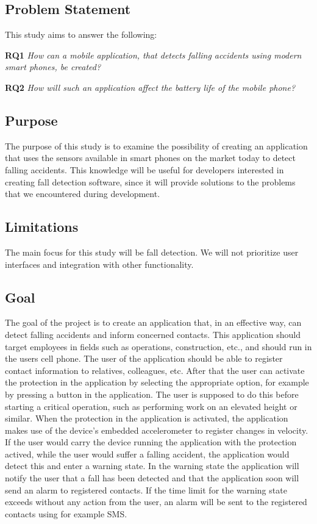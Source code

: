 \documentclass[12pt, a4paper, onecolumn]{article}
\begin{document}
		\subsection{Problem Statement}
		
		This study aims to answer the following:
		
		\textbf{RQ1} \textit{How can a mobile application, that detects falling accidents using modern smart phones, be created?}
		
		\textbf{RQ2} \textit{How will such an application affect the battery life of the mobile phone?}
		
		
		\subsection{Purpose}
		
		The purpose of this study is to examine the possibility of creating an application that uses the sensors available in smart phones on the market today to detect falling accidents. This knowledge will be useful for developers interested in creating fall detection software, since it will provide solutions to the problems that we encountered during development.
		
		\subsection{Limitations}

		The main focus for this study will be fall detection. We will not prioritize user interfaces and integration with other functionality.
		
		\subsection{Goal}
		
		The goal of the project is to create an application that, in an effective way, can detect falling accidents and inform concerned contacts. This application should target employees in fields such as operations, construction, etc., and should run in the users cell phone. The user of the application should be able to register contact information to relatives, colleagues, etc. After that the user can activate the protection in the application by selecting the appropriate option, for example by pressing a button in the application. The user is supposed to do this before starting a critical operation, such as performing work on an elevated height or similar. When the protection in the application is activated, the application makes use of the device's embedded accelerometer to register changes in velocity. If the user would carry the device running the application with the protection actived, while the user would suffer a falling accident, the application would detect this and enter a warning state. In the warning state the application will notify the user that a fall has been detected and that the application soon will send an alarm to registered contacts. If the time limit for the warning state exceeds without any action from the user, an alarm will be sent to the registered contacts using for example SMS.
		
\end{document}
